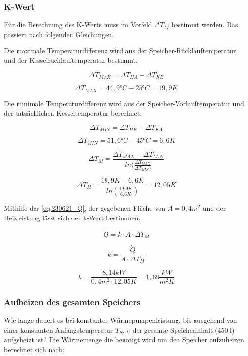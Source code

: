 \subsubsection*{K-Wert}
Für die Berechnung des K-Werts muss im Vorfeld $\Delta T_M$ bestimmt werden. Das passiert nach folgenden Gleichungen.

Die maximale Temperaturdifferenz wird aus der Speicher-Rücklauftemperatur und der Kesselrücklauftemperatur bestimmt.

\begin{equation}
    \Delta T_{MAX}= \Delta T_{HA}-\Delta T_{KE}
    \label{eq:230621_DeltaTMAX}
\end{equation}



$$\Delta T_{MAX}= 44,9\text{°}C-25 \text{°} C= 19,9K$$

Die minimale Temperaturdifferenz wird aus der Speicher-Vorlauftemperatur und der tatsächlichen Kesseltemperatur berechnet.

\begin{equation}
    \Delta T_{MIN}= \Delta T_{HE}-\Delta T_{KA}
    \label{eq:230621_DeltaTMIN}
\end{equation}

$$\Delta T_{MIN}= 51,6 \text{°} C-45 \text{°} C= 6,6K$$

\begin{equation}
    \Delta T_{M}= \frac{\Delta T_{MAX}-\Delta T_{MIN}}{ln(\frac{\Delta T_{MAX}}{\Delta T_{MIN})}}
    \label{eq:230621_DeltaTM}
\end{equation}

$$\Delta T_M= \frac{19,9K-6,6K}{ln(\frac{19,9K}{6,6K})}= 12,05K$$

Mithilfe der \autoref{eq:230621_Q}, der gegebenen Fläche von $A= 0,4m^2$ und der Heizleistung lässt sich der k-Wert bestimmen.

\begin{equation}
    \dot{Q}=k\cdot A \cdot \Delta T_M
    \label{eq:230621_Q}
\end{equation}

\begin{equation}
    k = \frac{\dot{Q}}{ A \cdot \Delta T_M} 
    \label{eq:230621_k}
\end{equation}

$$k=\frac{8,14 kW}{ 0,4m^2 \cdot 12,05K}=1,69 \frac{kW}{m^2K}$$

\subsubsection{Aufheizen des gesamten Speichers}
Wie lange dauert es bei konstanter Wärmepumpenleistung, bis ausgehend von einer
konstanten Anfangstemperatur \texorpdfstring{$T_{Sp,U}$}{} der gesamte Speicherinhalt (450 l) aufgeheizt ist?
Die Wärmemenge die benötigt wird um den Speicher aufzuheizen berechnet sich nach:

